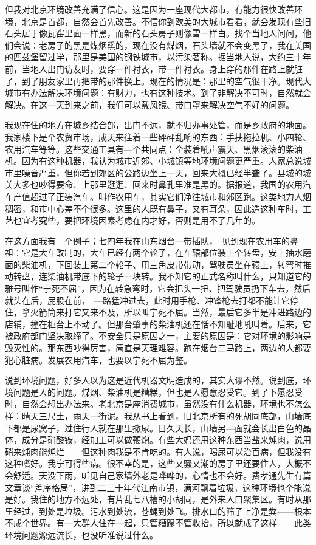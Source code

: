 但我对北京环境改善充满了信心。这是因为一座现代大都市，有能力很快改善环境，北京是首都，自然会首先改善。不信你到欧美的大城市看看，就会发现有些旧石头居于像瓦窑里面一样黑，而新的石头房子则像雪一样白。找个当地人问问，他们会说：老房子的黑是煤烟熏的，现在没有煤烟，石头墙就不会变黑了，我在美国的匹兹堡留过学，那里是美国的钢铁城市，以污染著称。据当地人说，大约三十年前，当地人出门访友时，要穿一件衬衣，带一件衬衣。身上穿的那件在路上就脏了，到了朋友家里再把带的那件换上。现在的情况是：那里的空气很干净。现代大城市有办法解决环境问题：有财力，也有这种技术。到了非解决不可时，自然就会解决。在这一天到来之前，我们可以戴风镜、带口罩来解决空气不好的问题。 

我现在住的地方在城乡结合部，出门不远，就不归办事处管，而是乡政府的地面。我家楼下是个农贸市场，成天来往着一些砰砰乱响的东西：手扶拖拉机、小四轮、农用汽车等等。这些交通工具有—个共同点：全装着吼声震天、黑烟滚滚的柴油机。因为有这种机器，我认为城市近郊、小城镇等地环境问题更严重。人家总说城市里噪音严重，但你若到郊区的公路边坐上一天，回来大概已经半聋了。县城的城关大多也吵得要命、上那里逛逛、回来时鼻孔里准是黑的。据报道，我国的农用汽车产值超过了正装汽车。叫作农用车，其实它们净往城市和郊区跑。这类地力人烟稠密，和市中心差不个很多。这里的人既有鼻子，又有耳朵，因此造这种车时，工艺也宜考究些，要把环境因素考虑在内才好，否则是用不了几年的。 

在这方面我有—个例子；七四年我在山东烟台一带插队，　见到现在农用车的鼻祖：它是大车改制的，大车已经有两个轮子，在车辕部位装上个转盘，安上抽水磨面的柴油机，下回装上第二个轮子、用三角皮带带动，驾驶员坐在辕上，转弯时推动转盘，连柒油机带底下的轮子一块转。我不知它的正式名称叫什么，只知道它的雅号叫作“宁死不屈”，因为在转急弯时，它会把头一扭、把驾驶员扔下车去，然后就头在后，屁股在前，　—路猛冲过去，此时用手枪、冲锋枪去打都不能让它停住，拿火箭筒来打它又来不及，所以叫宁死不屈。当然，最后它多半是冲进路边的店铺，撞在柜台上不动了。但那台肇事的柴油机还在恬不知耻地吼叫着。后来，它被政府部门坚决取缔了。不安全只是原因之一，主要的原因是：它对环境的影响是毁灭性的。那东西吵得厉害，简直是天理难容。跑在烟台二马路上，两边的人都要犯心脏病。发展农用汽车，也要以宁死不屈为鉴。 

说到环境问题，好多人以为这是近代机器文明造成的，其实大谬不然。说到底，环境问题是人的问题。煤烟、柴油机是糟糕，但也是人愿意忍受它。到了下愿忍受时，自然会想出办法来。老北京是座消费城市，虽然没有什么机器，环境也不怎么样：晴天三尺土，雨天一街泥。我从书上看到，旧北京所有的死胡同底部，山墙底下都是尿窝子，过住行人就在那里撒尿。日久天长，山墙另—面就会长出白色的晶体，成分是硝酸铵，经加工可以做鞭炮。有些大妈还用这种东西当盐来炖肉，说用硝来炖肉能炖烂——但这种肉我是不肯吃的。有人说，喝尿可以治百病，但我没有这种嗜好。我宁可得些病。很不幸的是，这些又骚又潮的房子里还要住人，大概不会舒适。天没下雨，听见自己家墙外老是哗哗的，心情也不会好。费孝通先生有篇文章谈“差序格局”，讲到二三十年代江南市镇，满河飘着垃圾，这种环境也个能说是好。我住的地方不远处，有片乱七八槽的小胡同，是外来人口聚集区。有时从那里经过，到处是垃圾。污水到处流，苍蝇到处飞。排水口的筛子上净是粪——根本不成个世界。有一大群人住在一起，只管糟蹋不管收拾，所以就成了这样——此类环境问题源远流长，也没听准说过什么。 

